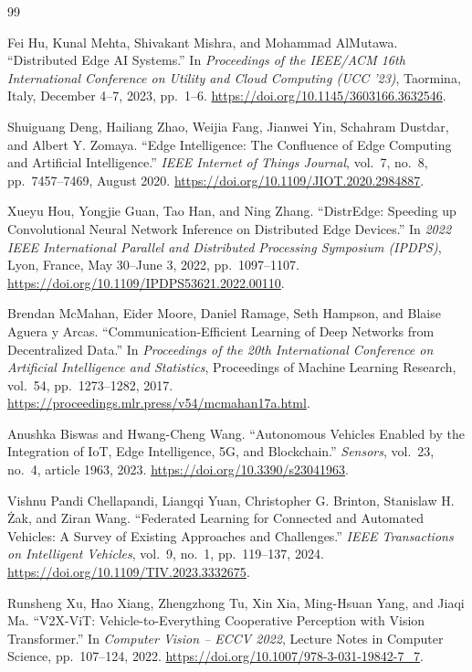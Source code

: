 \documentclass[12pt,a4paper,oneside]{report}
\begin{document}
\begin{thebibliography}{99}

  Fei Hu, Kunal Mehta, Shivakant Mishra, and Mohammad AlMutawa.
  ``Distributed Edge AI Systems.'' In \textit{Proceedings of the IEEE/ACM
  16th International Conference on Utility and Cloud Computing (UCC '23)},
  Taormina, Italy, December 4--7, 2023, pp.\ 1--6.
  \url{https://doi.org/10.1145/3603166.3632546}.

  Shuiguang Deng, Hailiang Zhao, Weijia Fang, Jianwei Yin, Schahram
  Dustdar, and Albert Y. Zomaya.
  ``Edge Intelligence: The Confluence of Edge Computing and Artificial
  Intelligence.'' \textit{IEEE Internet of Things Journal}, vol.\ 7, no.\ 8,
  pp.\ 7457--7469, August 2020.
  \url{https://doi.org/10.1109/JIOT.2020.2984887}.

  Xueyu Hou, Yongjie Guan, Tao Han, and Ning Zhang.
  ``DistrEdge: Speeding up Convolutional Neural Network Inference on
  Distributed Edge Devices.'' In \textit{2022 IEEE International Parallel
  and Distributed Processing Symposium (IPDPS)}, Lyon, France, May 30--June 3,
  2022, pp.\ 1097--1107.
  \url{https://doi.org/10.1109/IPDPS53621.2022.00110}.

  Brendan McMahan, Eider Moore, Daniel Ramage, Seth Hampson, and Blaise
  Aguera y Arcas. ``Communication-Efficient Learning of Deep Networks from
  Decentralized Data.'' In \textit{Proceedings of the 20th International
  Conference on Artificial Intelligence and Statistics}, Proceedings of
  Machine Learning Research, vol.\ 54, pp.\ 1273--1282, 2017.
  \url{https://proceedings.mlr.press/v54/mcmahan17a.html}.

  Anushka Biswas and Hwang-Cheng Wang.
  ``Autonomous Vehicles Enabled by the Integration of IoT, Edge Intelligence,
  5G, and Blockchain.'' \textit{Sensors}, vol.\ 23, no.\ 4, article 1963,
  2023. \url{https://doi.org/10.3390/s23041963}.

  Vishnu Pandi Chellapandi, Liangqi Yuan, Christopher G. Brinton,
  Stanislaw H. \.{Z}ak, and Ziran Wang.
  ``Federated Learning for Connected and Automated Vehicles: A Survey of
  Existing Approaches and Challenges.'' \textit{IEEE Transactions on
  Intelligent Vehicles}, vol.\ 9, no.\ 1, pp.\ 119--137, 2024.
  \url{https://doi.org/10.1109/TIV.2023.3332675}.

  Runsheng Xu, Hao Xiang, Zhengzhong Tu, Xin Xia, Ming-Hsuan Yang, and
  Jiaqi Ma. ``V2X-ViT: Vehicle-to-Everything Cooperative Perception with
  Vision Transformer.'' In \textit{Computer Vision -- ECCV 2022},
  Lecture Notes in Computer Science, pp.\ 107--124, 2022.
  \url{https://doi.org/10.1007/978-3-031-19842-7_7}.


\end{thebibliography}
\end{document}

